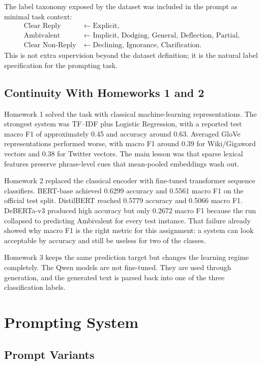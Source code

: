 \documentclass[12pt]{fphw}
\newcommand{\CR}{Clear Reply}
\newcommand{\AMB}{Ambivalent}
\newcommand{\CNR}{Clear Non-Reply}
\begin{document}
The label taxonomy exposed by the dataset was included in the prompt as minimal task context:
\[
\begin{aligned}
\text{\CR} &\leftarrow \text{Explicit}, \\
\text{\AMB} &\leftarrow \text{Implicit, Dodging, General, Deflection, Partial}, \\
\text{\CNR} &\leftarrow \text{Declining, Ignorance, Clarification}.
\end{aligned}
\]
This is not extra supervision beyond the dataset definition; it is the natural label specification for the prompting task.

\subsection{Continuity With Homeworks 1 and 2}

Homework 1 solved the task with classical machine-learning representations. The strongest system was TF--IDF plus Logistic Regression, with a reported test macro F1 of approximately 0.45 and accuracy around 0.63. Averaged GloVe representations performed worse, with macro F1 around 0.39 for Wiki/Gigaword vectors and 0.38 for Twitter vectors. The main lesson was that sparse lexical features preserve phrase-level cues that mean-pooled embeddings wash out.

Homework 2 replaced the classical encoder with fine-tuned transformer sequence classifiers. BERT-base achieved 0.6299 accuracy and 0.5561 macro F1 on the official test split. DistilBERT reached 0.5779 accuracy and 0.5066 macro F1. DeBERTa-v3 produced high accuracy but only 0.2672 macro F1 because the run collapsed to predicting \AMB{} for every test instance. That failure already showed why macro F1 is the right metric for this assignment: a system can look acceptable by accuracy and still be useless for two of the classes.

Homework 3 keeps the same prediction target but changes the learning regime completely. The Qwen models are not fine-tuned. They are used through generation, and the generated text is parsed back into one of the three classification labels.

\section{Prompting System}

\subsection{Prompt Variants}
\end{document}
